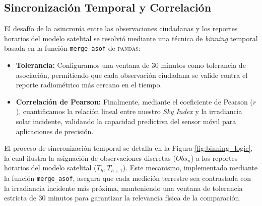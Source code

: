 \documentclass[twocolumn]{aastex701}
\begin{document}
\subsection{Sincronización Temporal y Correlación}
El desafío de la asincronía entre las observaciones ciudadanas y los reportes horarios del modelo satelital se resolvió mediante una técnica de \textit{binning} temporal basada en la función \texttt{merge\_asof} de \textsc{pandas}:
\begin{itemize}
    \item \textbf{Tolerancia:} Configuramos una ventana de 30 minutos como tolerancia de asociación, permitiendo que cada observación ciudadana se valide contra el reporte radiométrico más cercano en el tiempo.
    \item \textbf{Correlación de Pearson:} Finalmente, mediante el coeficiente de Pearson ($r$), cuantificamos la relación lineal entre nuestro \textit{Sky Index} y la irradiancia solar incidente, validando la capacidad predictiva del sensor móvil para aplicaciones de precisión.
\end{itemize}


El proceso de sincronización temporal se detalla en la Figura \ref{fig:binning_logic}, la cual ilustra la asignación de observaciones discretas ($Obs_n$) a los reportes horarios del modelo satelital ($T_h, T_{h+1}$). Este mecanismo, implementado mediante la función \texttt{merge\_asof}, asegura que cada medición terrestre sea contrastada con la irradiancia incidente más próxima, manteniendo una ventana de tolerancia estricta de 30 minutos para garantizar la relevancia física de la comparación.
\end{document}
